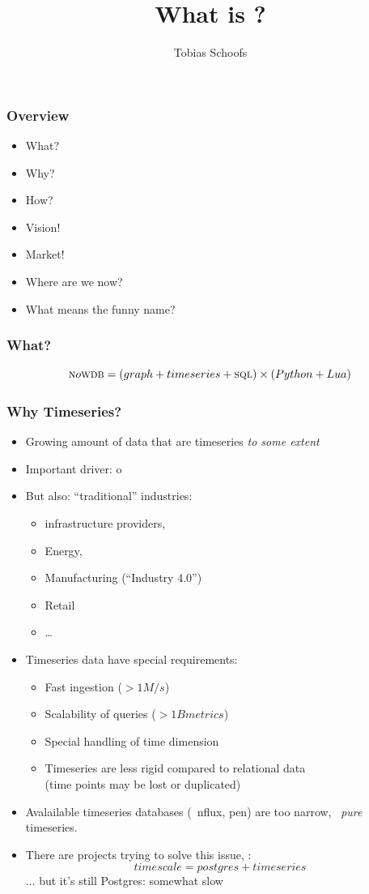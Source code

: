 \documentclass[mathserif]{beamer}
\title{What is \nowdb?}
\author{Tobias Schoofs}
\begin{document}
\frame{\titlepage}

\begin{frame}
\frametitle{Overview}
\begin{itemize}
\item What?
\item Why?
\item How?
\item Vision!
\item Market!
\item Where are we now?
\item What means the funny name?
\end{itemize}
\end{frame}

\begin{frame}
\frametitle{What?}
\begin{equation*}
\textsc{n}o\textsc{wdb} = (graph +  timeseries + \textsc{sql}) \times (Python + Lua)
\end{equation*}
\end{frame}

\begin{frame}[shrink]
\frametitle{Why Timeseries?}
\begin{itemize}
\item Growing amount of data that are timeseries \emph{to some extent}
\item Important driver: o
\item But also: ``traditional'' industries:
      \begin{itemize} 
      \item {} infrastructure providers,
      \item Energy,
      \item Manufacturing (``Industry 4.0'')
      \item Retail
      \item \dots
      \end{itemize}
\item Timeseries data have special requirements:
      \begin{itemize}
      \item Fast ingestion ($> 1M/s$)
      \item Scalability of queries ($> 1B metrics$)
      \item Special handling of time dimension
      \item Timeseries are less rigid compared to relational data\\
            (time points may be lost or duplicated)
      \end{itemize}
\item Avalailable timeseries databases
     (\eg\ nflux, pen) are too narrow, 
      \ie\ \emph{pure} timeseries.
\item There are projects trying to solve this issue,
      \eg: \[
      timescale = postgres + timeseries\]
      $\dots$ but it's still Postgres: somewhat slow
\end{itemize}
\end{frame}
\end{document}
